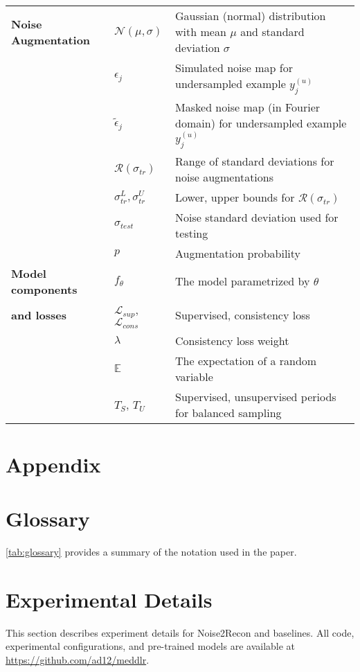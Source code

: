 \documentclass[10pt,twocolumn,letterpaper]{article}
\newcommand{\noiserange}{\mathcal{R}(\sigma_{tr})}
\newcommand{\testnoise}{\sigma_{test}}
\newcommand{\RV}[1]{{#1}}
\begin{document}
\begin{table*}[t]
{\begin{tabular}{@{}lll@{}}
      \textbf{Noise Augmentation} & $\mathcal{N}(\mu, \sigma)$ & Gaussian (normal) distribution with mean $\mu$ and standard deviation $\sigma$ \\
      & $\epsilon_j$ & Simulated noise map for undersampled example $y^{(u)}_j$ \\
      & \RV{$\tilde{\epsilon}_j$} & \RV{Masked noise map (in Fourier domain) for undersampled example $y^{(u)}_j$} \\
      & $\noiserange$ & Range of standard deviations for noise augmentations \\
      & $\sigma_{tr}^L, \sigma_{tr}^U$ & Lower, upper bounds for $\noiserange$ \\
      & $\testnoise$ & Noise standard deviation used for testing \\
      & $p$ & Augmentation probability \\
      
    
      \textbf{Model components} & $f_{\theta}$ & The model parametrized by $\theta$\\ 
      \textbf{and losses}   & $\mathcal{L}_{sup}$, $\mathcal{L}_{cons}$      & Supervised, consistency loss\\
          &     $\lambda$      & Consistency loss weight \\
          & \RV{$\mathbb{E}$} & \RV{The expectation of a random variable} \\
         & $T_S$, $T_U$ & Supervised, unsupervised periods for balanced sampling \\
      \bottomrule
    \end{tabular}%
    }
\end{table*}

\section*{Appendix}
\appendix

\section{Glossary}
\label{app:glossary}
\cref{tab:glossary} provides a summary of the notation used in the paper.
\section{Experimental Details}
This section describes experiment details for Noise2Recon and baselines. All code, experimental configurations, and pre-trained models are available at \url{https://github.com/ad12/meddlr}.
\end{document}
